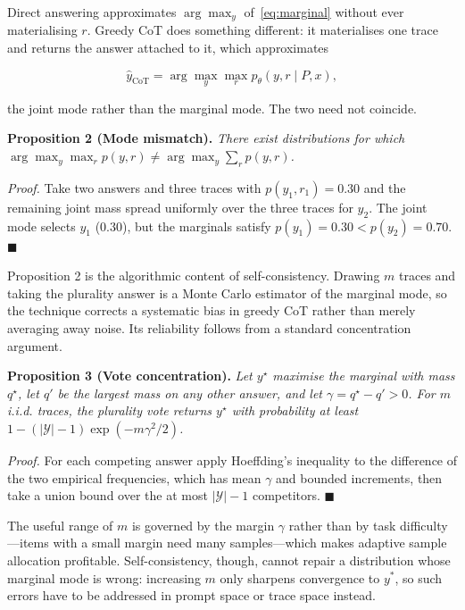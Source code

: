 \documentclass[conference]{IEEEtran}
\begin{document}
Direct answering approximates $\arg\max_{y}$ of~\eqref{eq:marginal}
without ever materialising $r$.  Greedy CoT does something different:
it materialises one trace and returns the answer attached to it, which
approximates

\begin{equation}
\hat{y}_{\mathrm{CoT}} = \arg\max_{y} \max_{r} p_{\theta}(y, r \mid P, x),
\label{eq:cot-joint}
\end{equation}

the joint mode rather than the marginal mode.  The two need not
coincide.

\textbf{Proposition 2 (Mode mismatch).} \textit{There exist distributions for which $\arg\max_y\max_r p(y,r) \neq \arg\max_y\sum_r p(y,r)$.}

\textit{Proof.} Take two answers and three traces with $p(y_{1}, r_{1}) = 0.30$ and the remaining joint mass spread uniformly over the three traces for $y_{2}$. The joint mode selects $y_{1}$ (0.30), but the marginals satisfy $p(y_{1}) = 0.30 < p(y_{2}) = 0.70$. $\blacksquare$

Proposition 2 is the algorithmic content of self-consistency.  Drawing
$m$ traces and taking the plurality answer is a Monte Carlo estimator
of the marginal mode, so the technique corrects a systematic bias in
greedy CoT rather than merely averaging away noise.  Its reliability
follows from a standard concentration argument.

\textbf{Proposition 3 (Vote concentration).} \textit{Let $y^{\star}$ maximise the marginal with mass $q^{\star}$, let $q'$ be the largest mass on any other answer, and let $\gamma = q^{\star} - q' > 0$. For $m$ i.i.d. traces, the plurality vote returns $y^{\star}$ with probability at least $1 - (|\mathcal{Y}| - 1)\exp(-m\gamma^{2} /2)$.}

\textit{Proof.} For each competing answer apply Hoeffding's inequality to the difference of the two empirical frequencies, which has mean $\gamma$ and bounded increments, then take a union bound over the at most $|\mathcal{Y}| - 1$ competitors. $\blacksquare$

The useful range of $m$ is governed by the margin $\gamma$ rather than
by task difficulty---items with a small margin need many samples---which
makes adaptive sample allocation profitable.  Self-consistency, though,
cannot repair a distribution whose marginal mode is wrong: increasing
$m$ only sharpens convergence to $y^{*}$, so such errors have to be
addressed in prompt space or trace space instead.
\end{document}
